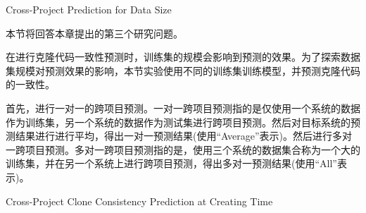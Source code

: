{Cross-Project Prediction for Data Size}

本节将回答本章提出的第三个研究问题。

在进行克隆代码一致性预测时，训练集的规模会影响到预测的效果。为了探索数据集规模对预测效果的影响，本节实验使用不同的训练集训练模型，并预测克隆代码的一致性。

首先，进行一对一的跨项目预测。一对一跨项目预测指的是仅使用一个系统的数据作为训练集，另一个系统的数据作为测试集进行跨项目预测。然后对目标系统的预测结果进行进行平均，得出一对一预测结果(使用“Average”表示)。然后进行多对一跨项目预测。多对一跨项目预测指的是，使用三个系统的数据集合称为一个大的训练集，并在另一个系统上进行跨项目预测，得出多对一预测结果(使用“All”表示)。%



{Cross-Project Clone Consistency Prediction at Creating Time}

